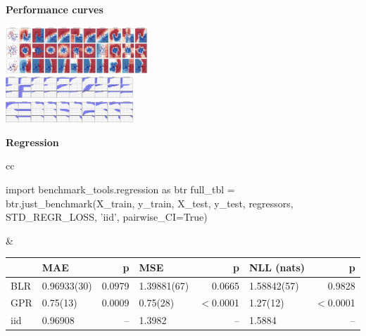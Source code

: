 \documentclass[a0,landscape]{a0poster}
\newcommand{\sectionx}{\textbf}
\begin{document}
\begin{multicols}{2}
\columnbreak

\sectionx{Performance curves}

\includegraphics[width=0.4\textwidth]{output.png}\\
\hspace*{1.75in}\includegraphics[width=0.36\textwidth]{AUC.png}\\
\hspace*{1.75in}\includegraphics[width=0.36\textwidth]{AP.png}

\sectionx{Regression}

\vspace{-1cm}

{\normalsize
\begin{tabular}{cc}
\begin{pycode}
import benchmark_tools.regression as btr
full_tbl = btr.just_benchmark(X_train, y_train, X_test, y_test,
                              regressors, STD_REGR_LOSS, 'iid',
                              pairwise_CI=True)
\end{pycode}
&
{\footnotesize
\begin{tabular}{|l|l|r|l|r|l|r|}
\toprule
{}  &        {MAE} &     {p} &        {MSE} &      {p} & {NLL (nats)} &      {p} \\
\midrule
BLR &  0.96933(30) &  0.0979 &  1.39881(67) &   0.0665 &  1.58842(57) &   0.9828 \\
GPR &  0.75(13)    &  0.0009 &  0.75(28)    &  $<$0.0001 &  1.27(12)    &  $<$0.0001 \\
iid &  0.96908     &    {--} &  1.3982      &     {--} &  1.5884      &     {--} \\
\bottomrule
\end{tabular}
}
\end{tabular}
}

\end{multicols}
\end{document}
